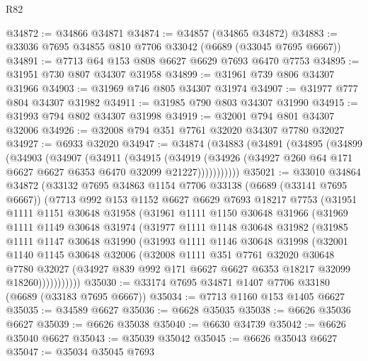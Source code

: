 \begin{lexlean}{R82}
\begin{coremodule}
@34872 := @34866 @34871
@34874 := @34857 (@34865 @34872)
@34883 := @33036 @7695 @34855 @810 @7706 @33042 (@6689 (@33045 @7695 @6667))
@34891 := @7713 @64 @153 @808 @6627 @6629 @7693 @6470 @7753
@34895 := @31951 @730 @807 @34307 @31958
@34899 := @31961 @739 @806 @34307 @31966
@34903 := @31969 @746 @805 @34307 @31974
@34907 := @31977 @777 @804 @34307 @31982
@34911 := @31985 @790 @803 @34307 @31990
@34915 := @31993 @794 @802 @34307 @31998
@34919 := @32001 @794 @801 @34307 @32006
@34926 := @32008 @794 @351 @7761 @32020 @34307 @7780 @32027
@34927 := @6933 @32020
@34947 := @34874
    (@34883
      (@34891
        (@34895
          (@34899
            (@34903
              (@34907
                (@34911
                  (@34915
                    (@34919
                      (@34926 (@34927 @260 @64 @171 @6627 @6627 @6353 @6470 @32099 @21227)))))))))))
@35021 := @33010
    @34864
    @34872
    (@33132
      @7695
      @34863
      @1154
      @7706
      @33138
      (@6689 (@33141 @7695 @6667))
      (@7713
        @992
        @153
        @1152
        @6627
        @6629
        @7693
        @18217
        @7753
        (@31951
          @1111
          @1151
          @30648
          @31958
          (@31961
            @1111
            @1150
            @30648
            @31966
            (@31969
              @1111
              @1149
              @30648
              @31974
              (@31977
                @1111
                @1148
                @30648
                @31982
                (@31985
                  @1111
                  @1147
                  @30648
                  @31990
                  (@31993
                    @1111
                    @1146
                    @30648
                    @31998
                    (@32001
                      @1140
                      @1145
                      @30648
                      @32006
                      (@32008
                        @1111
                        @351
                        @7761
                        @32020
                        @30648
                        @7780
                        @32027
                        (@34927 @839 @992 @171 @6627 @6627 @6353 @18217 @32099 @18260)))))))))))
@35030 := @33174 @7695 @34871 @1407 @7706 @33180 (@6689 (@33183 @7695 @6667))
@35034 := @7713 @1160 @153 @1405 @6627
@35035 := @34589 @6627
@35036 := @6628 @35035
@35038 := @6626 @35036 @6627
@35039 := @6626 @35038
@35040 := @6630 @34739
@35042 := @6626 @35040 @6627
@35043 := @35039 @35042
@35045 := @6626 @35043 @6627
@35047 := @35034 @35045 @7693

\end{coremodule}
\end{lexlean}
